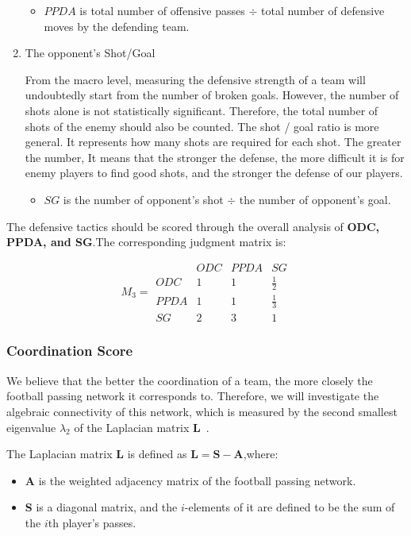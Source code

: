 \documentclass{mcmthesis}
\begin{document}
\begin{enumerate}
	\begin{itemize}
		\item $PPDA$ is total number of offensive passes $\div$ total number of defensive moves by the defending team.
	\end{itemize}

	\item The opponent's Shot/Goal
	
	\qquad From the macro level, measuring the defensive strength of a team will undoubtedly start from the number of broken goals.  However, the number of shots alone is not statistically significant. Therefore, the total number of shots of the enemy should also be counted. The shot / goal ratio is more general. It represents how many shots are required for each shot. The greater the number,  It means that the stronger the defense, the more difficult it is for enemy players to find good shots, and the stronger the defense of our players.

	\begin{itemize}
		\item $SG$ is the number of opponent's shot $\div$ the number of opponent's goal.
	\end{itemize}
	\end{enumerate}
	
	The defensive tactics should be scored through the overall analysis of \textbf{ODC, PPDA, and SG}.The corresponding judgment matrix is:

	\begin{equation}\label{mat:3}
		M_{3}=
	  \begin{matrix}
		& ODC & PPDA & SG\\
   		ODC & 1 & 1 & \frac{1}{2} \\
   		PPDA & 1 & 1 & \frac{1}{3} \\
   		SG & 2 & 3 & 1
  	\end{matrix}
	\end{equation}

\subsubsection{Coordination Score}
	 We believe that the better the coordination of a team, the more closely the football passing network it corresponds to.  Therefore, we will investigate the algebraic connectivity of this network, which is measured by the second smallest eigenvalue $\lambda_{2}$ of the Laplacian matrix $\textbf{L}$~\cite{First}.

	The Laplacian matrix $\textbf{L}$ is defined as $\textbf{L}=\textbf{S}-\textbf{A}$,where:
	\begin{itemize}
	\item \textbf{A} is the weighted adjacency matrix of the football passing network.
	\item \textbf{S} is a diagonal matrix, and the $i$-elements of it are defined to be the sum of the $i$th player's passes.
	\end{itemize}
\end{document}
